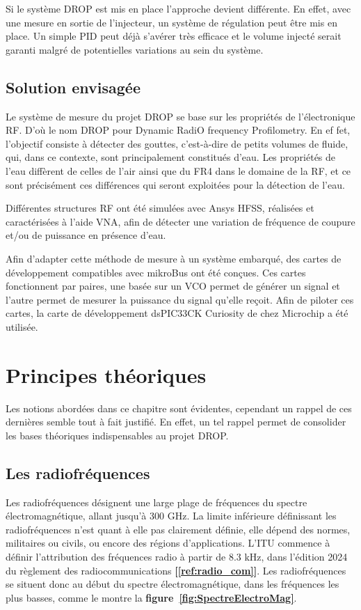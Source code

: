 \documentclass[12pt]{article}
\begin{document}
\newpage

Si le système DROP est mis en place l'approche devient différente. En effet, avec une mesure en sortie de l'injecteur, un système de régulation peut être mis en place. Un simple PID peut déjà s’avérer très efficace et le volume injecté serait garanti malgré de potentielles variations au sein du système.

\vspace{0.5cm}
\subsection{Solution envisagée}
Le système de mesure du projet DROP se base sur les propriétés de l'électronique RF. D'où le nom DROP pour Dynamic RadiO frequency Profilometry. En ef  fet, l'objectif consiste à détecter des gouttes, c'est-à-dire de petits volumes de fluide, qui, dans ce contexte, sont principalement constitués d'eau. Les propriétés de l'eau diffèrent de celles de l'air ainsi que du FR4 dans le domaine de la RF, et ce sont précisément ces différences qui seront exploitées pour la détection de l'eau.

\vspace{0.5cm}
Différentes structures RF ont été simulées avec Ansys HFSS, réalisées et caractérisées à l'aide VNA, afin de détecter une variation de fréquence de coupure et/ou de puissance en présence d'eau. 

\vspace{0.5cm}
Afin d’adapter cette méthode de mesure à un système embarqué, des cartes de développement compatibles avec mikroBus ont été conçues. Ces cartes fonctionnent par paires, une basée sur un VCO permet de générer un signal et l'autre permet de mesurer la puissance du signal qu'elle reçoit. Afin de piloter ces cartes, la  carte de développement dsPIC33CK Curiosity de chez Microchip a été utilisée.

\newpage
\section{Principes théoriques}
Les notions abordées dans ce chapitre sont évidentes, cependant un rappel de ces dernières semble tout à fait justifié. En effet, un tel rappel permet de consolider les bases théoriques indispensables au projet DROP.

\vspace{0.5cm}
\subsection{Les radiofréquences}
Les radiofréquences désignent une large plage de fréquences du spectre électromagnétique, allant jusqu’à 300 GHz. La limite inférieure définissant les radiofréquences n'est quant à elle pas clairement définie, elle dépend des normes, militaires ou civils, ou encore des régions d'applications. L'ITU commence à définir l'attribution des fréquences radio à partir de 8.3 kHz, dans l'édition 2024 du règlement des radiocommunications \textbf{[\ref{ref:radio_com}]}. Les radiofréquences se situent donc au début du spectre électromagnétique, dans les fréquences les plus basses, comme le montre  la \textbf{figure~\ref{fig:SpectreElectroMag}}.
\end{document}
